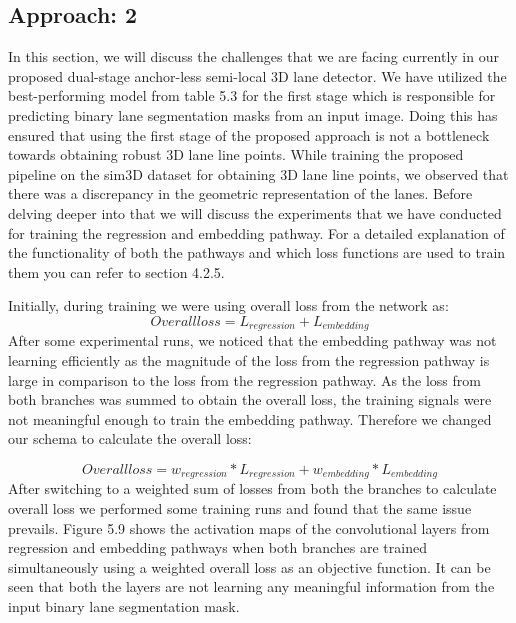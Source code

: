 \subsection{Approach: 2}
In this section, we will discuss the challenges that we are facing currently in our proposed dual-stage anchor-less semi-local 3D lane detector. We have utilized the best-performing model from table 5.3 for the first stage which is responsible for predicting binary lane segmentation masks from an input image. Doing this has ensured that using the first stage of the proposed approach is not a bottleneck towards obtaining robust 3D lane line points. While training the proposed pipeline on the sim3D dataset for obtaining 3D lane line points, we observed that there was a discrepancy in the geometric representation of the lanes. Before delving deeper into that we will discuss the experiments that we have conducted for training the regression and embedding pathway. For a detailed explanation of the functionality of both the pathways and which loss functions are used to train them you can refer to section 4.2.5. 

Initially, during training we were using overall loss from the network as: 
\begin{equation}
    Overall loss = L_{regression} + L_{embedding} 
\end{equation}
After some experimental runs, we noticed that the embedding pathway was not learning efficiently as the magnitude of the loss from the regression pathway is large in comparison to the loss from the regression pathway. As the loss from both branches was summed to obtain the overall loss, the training signals were not meaningful enough to train the embedding pathway. Therefore we changed our schema to calculate the overall loss:

\begin{equation}
    Overall loss = w_{regression} * L_{regression} + w_{embedding} * L_{embedding} 
\end{equation}
 After switching to a weighted sum of losses from both the branches to calculate overall loss we performed some training runs and found that the same issue prevails. Figure 5.9 shows the activation maps of the convolutional layers from regression and embedding pathways when both branches are trained simultaneously using a weighted overall loss as an objective function. It can be seen that both the layers are not learning any meaningful information from the input binary lane segmentation mask.  
 

